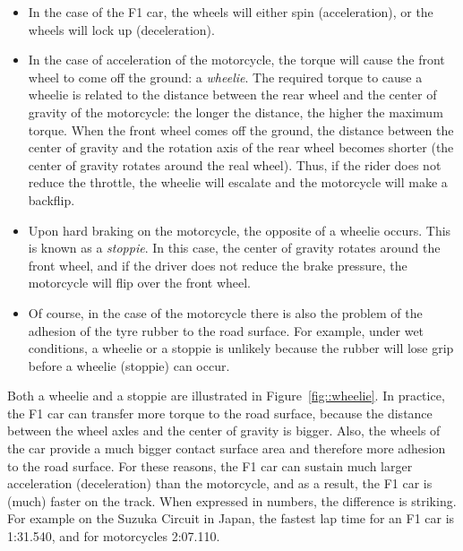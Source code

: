 \documentclass[12pt]{article}
\begin{document}
\begin{itemize}
\item In the case of the F1 car, the wheels will either spin (acceleration), or the wheels will lock up (deceleration).

\item In the case of acceleration of the motorcycle, the torque will cause the front wheel to come off the ground: a \emph{wheelie}. The required torque to cause a wheelie is related to the distance between the rear wheel and the center of gravity of the motorcycle: the longer the distance, the higher the maximum torque. When the front wheel comes off the ground, the distance between the center of gravity and the rotation axis of the rear wheel becomes shorter (the center of gravity rotates around the real wheel). Thus, if the rider does not reduce the throttle, the wheelie will escalate and the motorcycle will make a backflip.

\item Upon hard braking on the motorcycle, the opposite of a wheelie occurs. This is known as a \emph{stoppie}. In this case, the center of gravity rotates around the front wheel, and if the driver does not reduce the brake pressure, the motorcycle will flip over the front wheel.

\item Of course, in the case of the motorcycle there is also the problem of the adhesion of the tyre rubber to the road surface. For example, under wet conditions, a wheelie or a stoppie is unlikely because the rubber will lose grip before a wheelie (stoppie) can occur.
\end{itemize}

Both a wheelie and a stoppie are illustrated in Figure~\ref{fig::wheelie}. In practice, the F1 car can transfer more torque to the road surface, because the distance between the wheel axles and the center of gravity is bigger. Also, the wheels of the car provide a much bigger contact surface area and therefore more adhesion to the road surface. For these reasons, the F1 car can sustain much larger acceleration (deceleration) than the motorcycle, and as a result, the F1 car is (much) faster on the track. When expressed in numbers, the difference is striking. For example on the Suzuka Circuit in Japan, the fastest lap time for an F1 car is 1:31.540, and for motorcycles 2:07.110.
\end{document}
